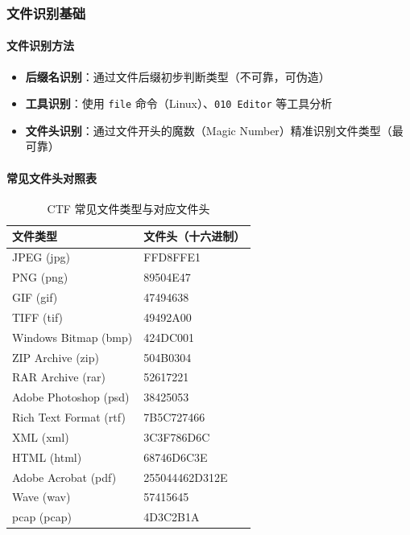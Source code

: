 \subsubsection{文件识别基础}
\paragraph{文件识别方法}
\begin{itemize}[leftmargin=*]
    \item \textbf{后缀名识别}：通过文件后缀初步判断类型（不可靠，可伪造）
    \item \textbf{工具识别}：使用 \texttt{file} 命令（Linux）、\texttt{010 Editor} 等工具分析
    \item \textbf{文件头识别}：通过文件开头的魔数（Magic Number）精准识别文件类型（最可靠）
\end{itemize}

\paragraph{常见文件头对照表}
\begin{table}[htbp]
    \centering
    \caption{CTF 常见文件类型与对应文件头}
    \begin{tabular}{ll}
        \toprule
        文件类型 & 文件头（十六进制） \\
        \midrule
        JPEG (jpg) & FFD8FFE1 \\
        PNG (png) & 89504E47 \\
        GIF (gif) & 47494638 \\
        TIFF (tif) & 49492A00 \\
        Windows Bitmap (bmp) & 424DC001 \\
        ZIP Archive (zip) & 504B0304 \\
        RAR Archive (rar) & 52617221 \\
        Adobe Photoshop (psd) & 38425053 \\
        Rich Text Format (rtf) & 7B5C727466 \\
        XML (xml) & 3C3F786D6C \\
        HTML (html) & 68746D6C3E \\
        Adobe Acrobat (pdf) & 255044462D312E \\
        Wave (wav) & 57415645 \\
        pcap (pcap) & 4D3C2B1A \\
        \bottomrule
    \end{tabular}
\end{table}

